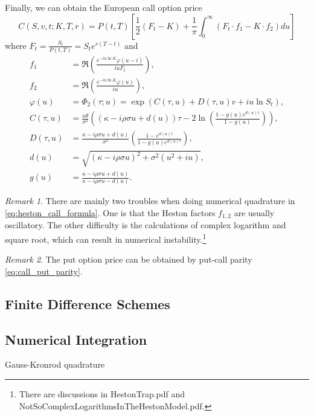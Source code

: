 \documentclass[a4paper,12pt]{article}
\numberwithin{equation}{section}
\theoremstyle{definition}
\theoremstyle{remark}
\newtheorem{remark}{Remark}[section]
\begin{document}
Finally, we can obtain the European call option price
\begin{equation}
\label{eq:heston_call_formula}
    C(S,v,t;K,T,r)=P(t,T)\left[\frac{1}{2}(F_{t}-K)+\frac{1}{\pi}
    \int_{0}^{\infty} \left(F_{t}\cdot f_{1}-K\cdot f_{2}\right) du\right]
\end{equation}
where $F_{t}=\frac{S_{t}}{P(t,T)}=S_{t}e^{r(T-t)}$ and 
\begin{equation}
    \begin{split}
        f_{1}&=\Re\left(\frac{e^{-iu\ln K}\varphi(u-i)}{iuF_{t}}\right), \\
        f_{2}&=\Re\left(\frac{e^{-iu\ln K}\varphi(u)}{iu}\right), \\
        \varphi(u)&=\Phi_{2}(\tau;u)=\exp({C(\tau,u)+D(\tau,u)v+iu\ln S_{t}}), \\
        C(\tau,u)&=\frac{\kappa\theta}{\sigma^{2}}\left((\kappa-i\rho\sigma u+d(u))
        \tau-2\ln\left(\frac{1-g(u)e^{d(u)\tau}}{1-g(u)}\right)\right), \\
        D(\tau,u)&=\frac{\kappa-i\rho\sigma u+d(u)}{\sigma^{2}}
        \left(\frac{1-e^{d(u)\tau}}{1-g(u)e^{d(u)\tau}}\right), \\
        d(u)&=\sqrt{(\kappa-i\rho\sigma u)^{2}+\sigma^{2}(u^{2}+iu)}, \\
        g(u)&=\frac{\kappa-i\rho\sigma u+d(u)}{\kappa-i\rho\sigma u-d(u)}.
    \end{split}
\end{equation}

\begin{remark}
There are mainly two troubles when doing numerical quadrature in 
\eqref{eq:heston_call_formula}. One is that the Heston factors 
$f_{1,2}$ are usually oscillatory. The other difficulty is the 
calculations of complex logarithm and square root, which can result 
in numerical instability.\footnote{There are discussions in 
HestonTrap.pdf and NotSoComplexLogarithmsInTheHestonModel.pdf.}
\end{remark}

\begin{remark}
The put option price can be obtained by put-call parity 
\eqref{eq:call_put_parity}.
\end{remark}

\subsection{Finite Difference Schemes}

\subsection{Numerical Integration}
Gauss-Kronrod quadrature
\end{document}
